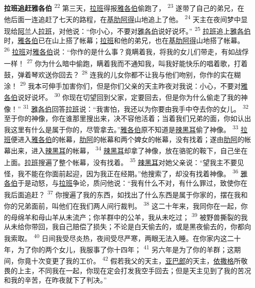 \textbf{拉班追赶雅各伯\quad}
\textsuperscript{22}
第三天，\uline{拉班}得报\uline{雅各伯}偷跑了，
\textsuperscript{23}
遂带了自己的弟兄，在他后面一连追赶了七天的路程，在\uline{基肋}\uline{阿得}山地追上了他。
\textsuperscript{24}
天主在夜间梦中显现给\uline{阿兰}人\uline{拉班}，对他说：“你小心，不要对\uline{雅各伯}说好说坏。”
\textsuperscript{25}
\uline{拉班}追上\uline{雅各伯}时，\uline{雅各伯}已在山上搭了帐幕；\uline{拉班}和他的弟兄，也在\uline{基肋}\uline{阿得}山地搭了帐幕。
\textsuperscript{26}
\uline{拉班}对\uline{雅各伯}说：“你作的是什么事？竟瞒着我，将我的女儿们带走，有如战俘一样！
\textsuperscript{27}
你为什么暗中偷跑，瞒着我而不通知我，叫我好能快乐的唱着歌，打着鼓，弹着琴欢送你回去？
\textsuperscript{28}
连我的儿女你都不让我与他们吻别，你作的实在糊涂！
\textsuperscript{29}
我本可伸手加害你们，但是你们父亲的天主昨夜对我说：小心，不要对\uline{雅各伯}说好说坏。
\textsuperscript{30}
你现在切望回到父家，定要回去，但是你为什么偷走了我的神像！”
\textsuperscript{31}
\uline{雅各伯}回答\uline{拉班}说：“我害怕，我还以为你要由我手中夺去你的女儿。
\textsuperscript{32}
至于你的神像，你在谁那里搜出来，决不容他活着；当着我们兄弟的面，你如认出我这里有什么是属于你的，尽管拿去。”\uline{雅各伯}原不知道是\uline{辣黑耳}偷了神像。
\textsuperscript{33}
\uline{拉班}便进入\uline{雅各伯}的帐幕，\uline{肋阿}的帐幕和两个婢女的帐幕，没有找着；遂由\uline{肋阿}的帐幕出来，进入\uline{辣黑耳}的帐幕，
\textsuperscript{34}
\uline{辣黑耳}却拿了神像，放在骆驼的鞍下，自己坐在上面。\uline{拉班}搜遍了整个帐幕，没有找着。
\textsuperscript{35}
\uline{辣黑耳}对她父亲说：“望我主不要见怪，我不能在你面前起迎，因为我正在经期。”他搜索了，却没有找着神像。
\textsuperscript{36}
\uline{雅各伯}于是动怒，与\uline{拉班}争论，质问他说：“我有什么不对，有什么罪过，致使你在我后面追赶？
\textsuperscript{37}
你搜遍了我的东西，如找出了什么东西是属于你家的，摆在我和你的兄弟面前，叫他们在我们两人间行裁判。
\textsuperscript{38}
这二十年来，我同你在一起，你的母绵羊和母山羊从未流产；你羊群中的公羊，我从未吃过；
\textsuperscript{39}
被野兽撕裂的我从未给你带回，我自己赔偿了损失；不论是白天偷去的，或是黑夜偷去的，你都向我索取。
\textsuperscript{40}
日间我受尽炎热，夜间受尽严寒，两眼无法入睡。在你家内这二十年，为了你的两个女儿，我服事了你十四年；
\textsuperscript{41}
另六年是为了你的羊群；这期间，你竟十次变更了我的工价。
\textsuperscript{42}
假若我父的天主，\uline{亚巴郎}的天主，\uline{依撒格}所敬畏的上主，不同我在一起，你现在定会打发我空手回去；但是天主见到了我的苦况和我的辛苦，在昨夜就下了判决。”

